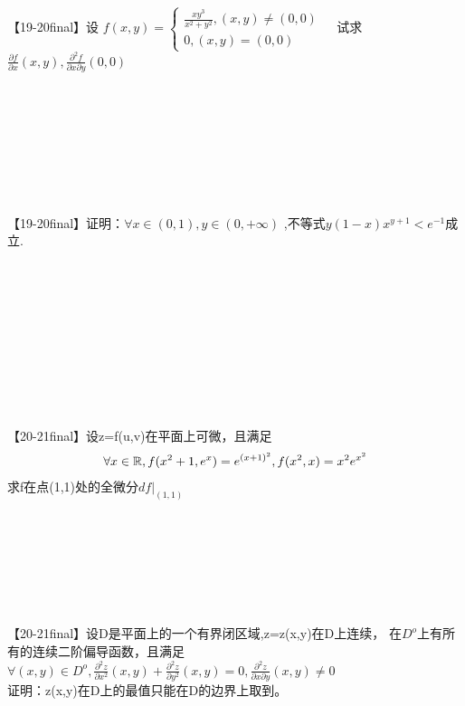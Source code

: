 \documentclass[12pt]{scrartcl}
\begin{document}
{\\
\\
\\
\\
\\
\\
\\
【19-20final】设
$f(x,y)=\left\{
            \begin{array}{lr}
            \frac{xy^3}{x^2+y^2},(x,y)\neq (0,0) &  \\
            0,(x,y)= (0,0) &  
            \end{array}
            \right.$
试求$\frac{\partial f}{\partial x}(x,y),
\frac{\partial^2 f}{\partial x \partial y}(0,0)$\leavevmode \newline
\\
\\
\\
\\
\\
\\
\\
\\
\\
【19-20final】证明：$\forall x\in(0,1),y\in(0,+\infty) $
,不等式$y(1-x)x^{y+1}<e^{-1}$成立.\leavevmode \newline
\\
\\
\\
\\
\\
\\
\\
\\
\\
\\
\\
【20-21final】设z=f(u,v)在平面上可微，且满足
\begin{gather}
    \forall x \in \mathbb{R} ,f(x^2+1,e^x)=e^{(x+1)^2},
    f(x^2,x)=x^2e^{x^2} \notag
\end{gather}
求f在点(1,1)处的全微分$df| _{(1,1)}$\leavevmode \newline
\\
\\
\\
\\
\\
\\
\\
\\
【20-21final】设D是平面上的一个有界闭区域,z=z(x,y)在D上连续，
在$D^o$上有所有的连续二阶偏导函数，且满足
$\forall(x,y)\in D^o,
\frac{\partial^2 z}{\partial x^2}(x,y)+
\frac{\partial^2 z}{\partial y^2}(x,y)=0,
\frac{\partial^2 z}{\partial x \partial y}(x,y)\neq 0$\\
证明：z(x,y)在D上的最值只能在D的边界上取到。
\leavevmode \newline
\\
\\
\\
\\
\\
\\
\\
}
\end{document}
